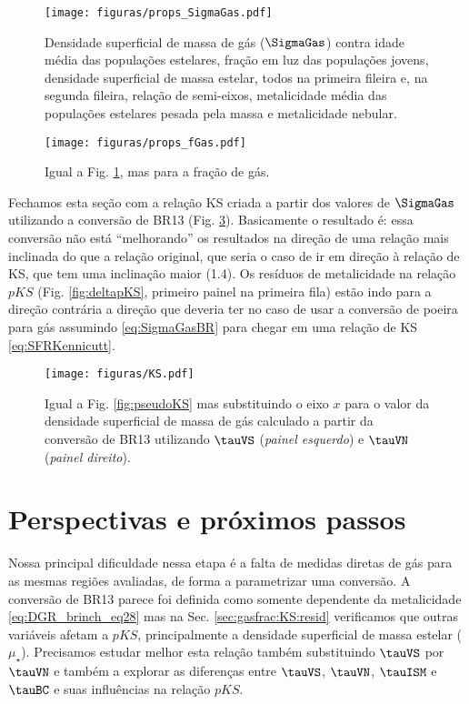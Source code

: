 \begin{figure}
	\centering
 	\texttt{[image: figuras/props\_SigmaGas.pdf]}
 	\caption[Propriedades físicas e $\SigmaGas$]
 	{Densidade superficial de massa de gás ($\SigmaGas$) contra idade média das populações estelares,
fração em luz das populações jovens, densidade superficial de massa estelar, todos na primeira
fileira e, na segunda fileira, relação de semi-eixos, metalicidade média das populações estelares
pesada pela massa e metalicidade nebular.}
	\label{fig:propsSigmaGas}
\end{figure}

\begin{figure}
	\centering
 	\texttt{[image: figuras/props\_fGas.pdf]}
 	\caption[Propriedades físicas e $f_{\mathrm{gas}}$]
 	{Igual a Fig. \ref{fig:propsSigmaGas}, mas para a fração de gás.}
 	\label{fig:propsfGas}
\end{figure} 

Fechamos esta seção com a relação KS criada a partir dos valores de $\SigmaGas$ utilizando a
conversão de BR13 (Fig. \ref{fig:KS}). Basicamente o resultado é: essa conversão não está
``melhorando'' os resultados na direção de uma relação mais inclinada do que a relação original, que
seria o caso de ir em direção à relação de KS, que tem uma inclinação maior (1.4). Os resíduos de
metalicidade na relação $pKS$ (Fig. \ref{fig:deltapKS}, primeiro painel na primeira fila) estão indo
para a direção contrária a direção que deveria ter no caso de usar a conversão de poeira para gás
assumindo \eqref{eq:SigmaGasBR} para chegar em uma relação de KS \eqref{eq:SFRKennicutt}.

\begin{figure}
	\centering
	\texttt{[image: figuras/KS.pdf]}
	\caption[Relação de Kennicut-Schmidt]
	{Igual a Fig. \ref{fig:pseudoKS} mas substituindo o eixo $x$ para o valor da densidade superficial
de massa de gás calculado a partir da conversão de BR13 utilizando $\tauVS$ ({\em painel esquerdo})
e $\tauVN$ ({\em painel direito}).}
	\label{fig:KS}
\end{figure}

\section{Perspectivas e próximos passos}
\label{sec:gasfrac:nextsteps}

Nossa principal dificuldade nessa etapa é a falta de medidas diretas de gás para as mesmas regiões
avaliadas, de forma a parametrizar uma conversão. A conversão de BR13 parece foi definida como
somente dependente da metalicidade \eqref{eq:DGR_brinch_eq28} mas na Sec. \ref{sec:gasfrac:KS:resid}
verificamos que outras variáveis afetam a $pKS$, principalmente a densidade superficial de massa
estelar ($\mu_\star$). Precisamos estudar melhor esta relação também substituindo $\tauVS$ por $\tauVN$ e
também a explorar as diferenças entre $\tauVS$, $\tauVN$, $\tauISM$ e $\tauBC$ e suas influências na
relação $pKS$. 

